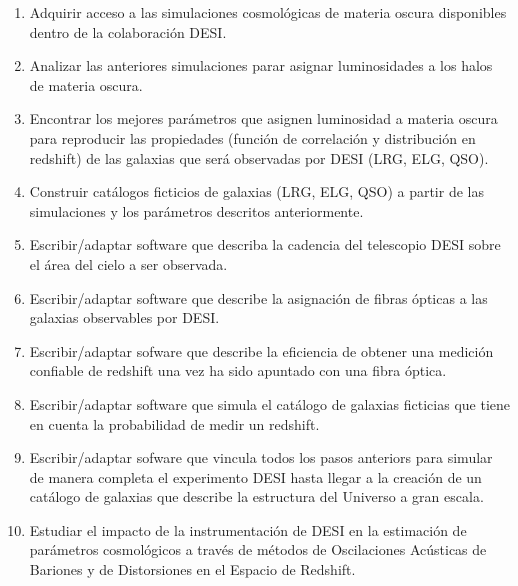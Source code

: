 \begin{enumerate}
\item Adquirir acceso a las simulaciones cosmol\'ogicas de materia
  oscura disponibles dentro de la colaboraci\'on DESI.

\item Analizar las anteriores simulaciones parar asignar luminosidades
  a los halos de materia oscura.

\item Encontrar los mejores par\'ametros que asignen luminosidad a
  materia oscura para reproducir las propiedades (funci\'on de
  correlaci\'on y distribuci\'on en redshift) de las galaxias que
  ser\'a observadas por DESI (LRG, ELG, QSO).

\item Construir cat\'alogos ficticios de galaxias (LRG, ELG, QSO) a
  partir de las simulaciones y los par\'ametros descritos
  anteriormente.

\item Escribir/adaptar software que describa la cadencia del
  telescopio DESI sobre el \'area del cielo a ser observada.

\item Escribir/adaptar software que describe la asignaci\'on de fibras
  \'opticas a las galaxias observables por DESI.

\item Escribir/adaptar sofware que describe la eficiencia de obtener
  una medici\'on confiable de redshift una vez ha sido apuntado con
  una fibra \'optica.

\item Escribir/adaptar software que simula el cat\'alogo de
  galaxias ficticias que tiene en cuenta la probabilidad de medir
  un redshift.

\item Escribir/adaptar sofware que vincula todos los pasos anteriors
  para simular de manera completa el experimento DESI hasta llegar a
  la creaci\'on de un cat\'alogo de galaxias que describe la
  estructura del Universo a gran escala.

\item Estudiar el impacto de la instrumentaci\'on de DESI en la
  estimaci\'on de par\'ametros cosmol\'ogicos a trav\'es de m\'etodos 
  de Oscilaciones Ac\'usticas de Bariones y de Distorsiones en el
  Espacio de Redshift.
\end{enumerate}


